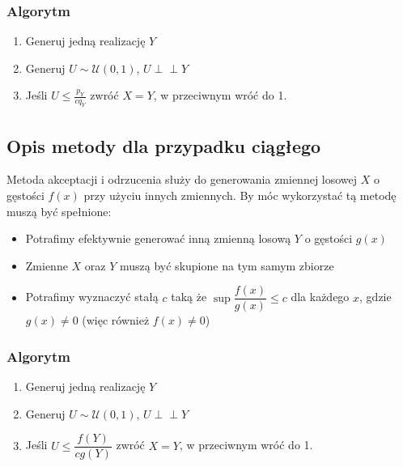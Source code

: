 \documentclass[12pt]{mwrep}
\newcommand{\indep}{\perp \!\!\! \perp}
\begin{document}
	\subsubsection{Algorytm}
	\begin{enumerate}[leftmargin=10mm]
		\item Generuj jedną realizację $Y$
		\item Generuj $U\sim \mathcal{U}(0,1)$, $U\indep Y$
		\item Jeśli $U\leqslant\frac{p_Y}{cq_Y}$ zwróć $X=Y$, w przeciwnym wróć do 1.
	\end{enumerate}
	
	
	\subsection{Opis metody dla przypadku ciągłego\textsuperscript{\cite{AO - ciagly}}}
	M\noindent etoda akceptacji i odrzucenia służy do generowania zmiennej losowej $X$ o gęstości $f(x)$ przy użyciu innych zmiennych. By móc wykorzystać tą metodę muszą być spełnione:
	\begin{itemize}[leftmargin=10mm]
		\item Potrafimy efektywnie generować inną zmienną losową $Y$ o gęstości $g(x)$
		\item Zmienne $X$ oraz $Y$ muszą być skupione na tym samym zbiorze
		\item Potrafimy wyznaczyć stałą $c$ taką że $\sup\dfrac{f(x)}{g(x)}\leqslant c$ dla każdego $x$, gdzie $g(x)\neq0$ (więc również $f(x)\neq0$)
	\end{itemize}
	\subsubsection{Algorytm}
	\begin{enumerate}[leftmargin=10mm]
		\item Generuj jedną realizację $Y$
		\item Generuj $U\sim \mathcal{U}(0,1)$, $U\indep Y$
		\item Jeśli $U\leqslant\dfrac{f(Y)}{cg(Y)}$ zwróć $X=Y$, w przeciwnym wróć do 1.
	\end{enumerate}
\end{document}
